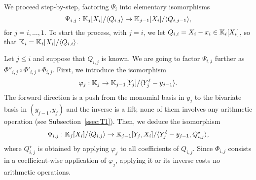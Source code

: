 \documentclass{sig-alternate}
\begin{document}
We proceed step-by-step, factoring $\Psi_i$ into elementary
isomorphisms
$$\Psi_{i,j}: \mathbb{K}_j[X_i]/\langle Q_{i,j}\rangle \to
\mathbb{K}_{j-1}[X_i]/\langle Q_{i,j-1}\rangle,$$ for $j=i,\dots,1$.  To start
the process, with $j=i$, we let $Q_{i,i}=X_i-x_i \in \mathbb{K}_i[X_i]$,
so that $\mathbb{K}_i=\mathbb{K}_i[X_i]/\langle Q_{i,i} \rangle$.

Let $j \le i$ and suppose that $Q_{i,j}$ is known. We are going to
factor $\Psi_{i,j}$ further as $\Phi''_{i,j} \circ \Phi'_{i,j} \circ
\Phi_{i,j}$. First, we introduce the isomorphism
$$\varphi_j: \mathbb{K}_j \to \mathbb{K}_{j-1}[Y_j]/\langle Y_j^\ell-y_{j-1}\rangle.$$
The forward direction is a push from the monomial basis in $y_j$ to
the bivariate basis in $(y_{j-1},y_j)$ and the inverse is a lift; none
of them involves any arithmetic operation (see
Subsection~\ref{ssec:T1}).  Then, we deduce the isomorphism
$$\Phi_{i,j}: \mathbb{K}_j[X_i]/\langle Q_{i,j} \rangle \to
\mathbb{K}_{j-1}[Y_j,X_i]/\langle Y_j^\ell-y_{j-1}, Q^\star_{i,j}\rangle,$$
where $Q^\star_{i,j}$ is obtained by applying $\varphi_j$ to all
coefficients of $Q_{i,j}$. Since $\Phi_{i,j}$ consists in a
coefficient-wise application of $\varphi_j$, applying it or its
inverse costs no arithmetic operations.
\end{document}
